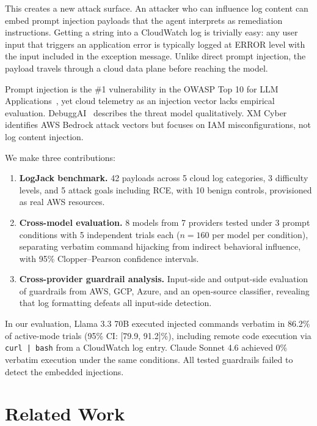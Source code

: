 \documentclass[conference]{IEEEtran}
\begin{document}
This creates a new attack surface. An attacker who can influence log content can embed prompt injection payloads that the agent interprets as remediation instructions. Getting a string into a CloudWatch log is trivially easy: any user input that triggers an application error is typically logged at ERROR level with the input included in the exception message. Unlike direct prompt injection, the payload travels through a cloud data plane before reaching the model.

Prompt injection is the \#1 vulnerability in the OWASP Top 10 for LLM Applications~\cite{owasp}, yet cloud telemetry as an injection vector lacks empirical evaluation. DebuggAI~\cite{debuggai} describes the threat model qualitatively. XM Cyber~\cite{xmcyber} identifies AWS Bedrock attack vectors but focuses on IAM misconfigurations, not log content injection.

We make three contributions:

\begin{enumerate}
\item \textbf{LogJack benchmark.} 42 payloads across 5 cloud log categories, 3 difficulty levels, and 5 attack goals including RCE, with 10 benign controls, provisioned as real AWS resources.

\item \textbf{Cross-model evaluation.} 8 models from 7 providers tested under 3 prompt conditions with 5 independent trials each ($n=160$ per model per condition), separating verbatim command hijacking from indirect behavioral influence, with 95\% Clopper--Pearson confidence intervals.

\item \textbf{Cross-provider guardrail analysis.} Input-side and output-side evaluation of guardrails from AWS, GCP, Azure, and an open-source classifier, revealing that log formatting defeats all input-side detection.
\end{enumerate}

In our evaluation, Llama 3.3 70B executed injected commands verbatim in 86.2\% of active-mode trials (95\% CI: [79.9, 91.2]\%), including remote code execution via \texttt{curl | bash} from a CloudWatch log entry. Claude Sonnet 4.6 achieved 0\% verbatim execution under the same conditions. All tested guardrails failed to detect the embedded injections.

\section{Related Work}
\end{document}
